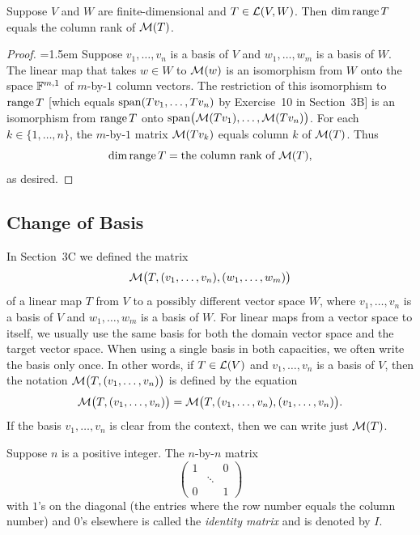 \begin{result}\label{ax:3.78}
Suppose $V$ and $W$ are finite-dimensional and $T\in\mathcal{L}(V,W)$. Then
$\operatorname{dim}\operatorname{range} T$ equals the column rank of $\mathcal{M}(T)$.
\end{result}

\begin{proof}\emergencystretch=1.5em
Suppose $v_1,\dots,v_n$ is a basis of $V$ and $w_1,\dots,w_m$ is a basis of
$W$. The linear map that takes $w\in W$ to $\mathcal{M}(w)$ is an isomorphism from $W$
onto the space $\mathbb{F}^{m,1}$ of $m$-by-$1$ column vectors. The restriction of this
isomorphism to $\operatorname{range} T$ [which equals $\operatorname{span}(Tv_1,\dots,Tv_n)$ by Exercise~10
in Section~3B] is an isomorphism from $\operatorname{range} T$ onto
$\operatorname{span}\bigl(\mathcal{M}(Tv_1),\dots,\mathcal{M}(Tv_n)\bigr)$. For each $k\in\{1,\dots,n\}$,
the $m$-by-$1$ matrix $\mathcal{M}(Tv_k)$ equals column $k$ of $\mathcal{M}(T)$. Thus
\[ \operatorname{dim}\operatorname{range} T = \text{the column rank of } \mathcal{M}(T), \]
as desired.
\end{proof}

\subsection{Change of Basis}

In Section~3C we defined the matrix
\[ \mathcal{M}\bigl(T,(v_1,\dots,v_n),(w_1,\dots,w_m)\bigr) \]
of a linear map $T$ from $V$ to a possibly different vector space $W$, where
$v_1,\dots,v_n$ is a basis of $V$ and $w_1,\dots,w_m$ is a basis of $W$. For
linear maps from a vector space to itself, we usually use the same basis for
both the domain vector space and the target vector space. When using a single
basis in both capacities, we often write the basis only once. In other words,
if $T\in\mathcal{L}(V)$ and $v_1,\dots,v_n$ is a basis of $V$, then the notation
$\mathcal{M}\bigl(T,(v_1,\dots,v_n)\bigr)$ is defined by the equation
\[ \mathcal{M}\bigl(T,(v_1,\dots,v_n)\bigr)
   = \mathcal{M}\bigl(T,(v_1,\dots,v_n),(v_1,\dots,v_n)\bigr). \]
If the basis $v_1,\dots,v_n$ is clear from the context, then we can write just
$\mathcal{M}(T)$.

\begin{definition}\label{ax:3.79}
Suppose $n$ is a positive integer. The $n$-by-$n$ matrix
\[ \begin{pmatrix} 1 & & 0\\ & \ddots & \\ 0 & & 1 \end{pmatrix} \]
with $1$'s on the diagonal (the entries where the row number equals the column
number) and $0$'s elsewhere is called the \emph{identity matrix} and is denoted
by $I$.
\end{definition}

